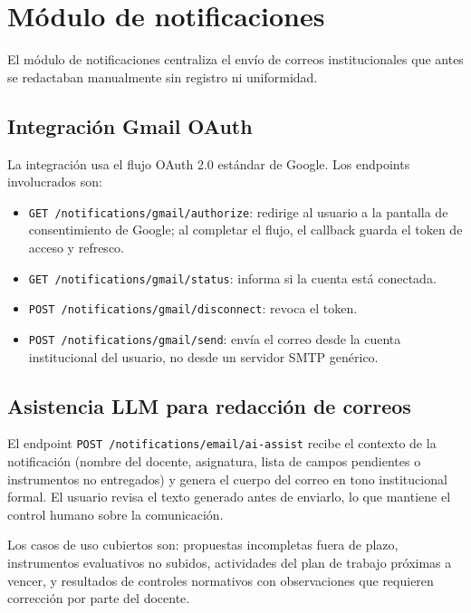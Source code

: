 \section{Módulo de notificaciones}
\label{sec:notificaciones}

El módulo de notificaciones centraliza el envío de correos institucionales
que antes se redactaban manualmente sin registro ni uniformidad.

\subsection{Integración Gmail OAuth}
\label{subsec:gmail_oauth}

La integración usa el flujo OAuth 2.0 estándar de Google.
Los endpoints involucrados son:
\begin{itemize}[noitemsep, topsep=2pt]
  \item \texttt{GET /notifications/gmail/authorize}: redirige al usuario
    a la pantalla de consentimiento de Google; al completar el flujo,
    el callback guarda el token de acceso y refresco.
  \item \texttt{GET /notifications/gmail/status}: informa si la cuenta
    está conectada.
  \item \texttt{POST /notifications/gmail/disconnect}: revoca el token.
  \item \texttt{POST /notifications/gmail/send}: envía el correo desde
    la cuenta institucional del usuario, no desde un servidor SMTP genérico.
\end{itemize}

\subsection{Asistencia LLM para redacción de correos}
\label{subsec:email_llm}

El endpoint \texttt{POST /notifications/email/ai-assist} recibe el
contexto de la notificación (nombre del docente, asignatura, lista de
campos pendientes o instrumentos no entregados) y genera el cuerpo del
correo en tono institucional formal.
El usuario revisa el texto generado antes de enviarlo, lo que mantiene
el control humano sobre la comunicación.

Los casos de uso cubiertos son: propuestas incompletas fuera de plazo,
instrumentos evaluativos no subidos, actividades del plan de trabajo
próximas a vencer, y resultados de controles normativos con
observaciones que requieren corrección por parte del docente.

